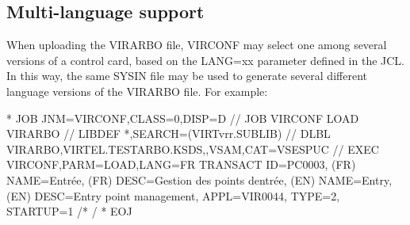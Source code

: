 \documentclass[letterpaper,10pt,english]{sphinxmanual}
\begin{document}
\subsection{Multi-language support}
\label{\detokenize{Installation_Guide:multi-language-support}}\label{\detokenize{Installation_Guide:index-158}}
When uploading the VIRARBO file, VIRCONF may select one among several versions of a control card, based on the LANG=xx parameter defined in the JCL. In this way, the same SYSIN file may be used to generate several different language versions of the VIRARBO file. For example:

\begin{sphinxVerbatim}[commandchars=\\\{\}]
* \PYGZdl{}\PYGZdl{} JOB JNM=VIRCONF,CLASS=0,DISP=D
// JOB VIRCONF LOAD VIRARBO
// LIBDEF *,SEARCH=(VIRTvrr.SUBLIB)
// DLBL VIRARBO,\PYGZsq{}VIRTEL.TESTARBO.KSDS\PYGZsq{},,VSAM,CAT=VSESPUC
// EXEC VIRCONF,PARM=\PYGZsq{}LOAD,LANG=FR\PYGZsq{}
        TRANSACT ID=PC\PYGZhy{}0003, \PYGZhy{}
        (FR) NAME=\PYGZsq{}Entrée\PYGZsq{}, \PYGZhy{}
        (FR) DESC=\PYGZdq{}Gestion des points d\PYGZsq{}entrée\PYGZdq{}, \PYGZhy{}
        (EN) NAME=\PYGZsq{}Entry\PYGZsq{}, \PYGZhy{}
        (EN) DESC=\PYGZsq{}Entry point management\PYGZsq{}, \PYGZhy{}
        APPL=VIR0044, \PYGZhy{}
        TYPE=2, \PYGZhy{}
        STARTUP=1
/*
/\PYGZam{}
* \PYGZdl{}\PYGZdl{} EOJ
\end{sphinxVerbatim}

\end{document}
